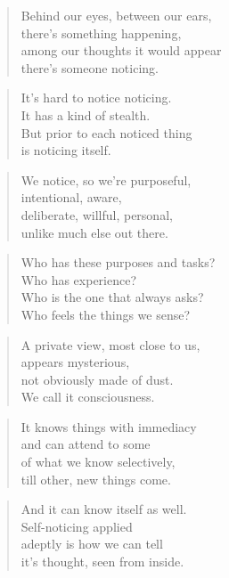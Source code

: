 \documentclass[10pt,a4paper]{article}
\begin{document}
\begin{paracol}{2}
\begin{verse}
Behind our eyes, between our ears,\\
there’s something happening,\\
among our thoughts it would appear\\
there’s someone noticing.
\end{verse}

\begin{verse}
It’s hard to notice noticing.\\
It has a kind of stealth.\\
But prior to each noticed thing\\
is noticing itself.
\end{verse}

\begin{verse}
We notice, so we’re purposeful,\\
intentional, aware,\\
deliberate, willful, personal,\\
unlike much else out there.
\end{verse}

\begin{verse}
Who has these purposes and tasks?\\
Who has experience?\\
Who is the one that always asks?\\
Who feels the things we sense?
\end{verse}

\begin{verse}
A private view, most close to us,\\
appears mysterious,\\
not obviously made of dust.\\
We call it consciousness.
\end{verse}

\begin{verse}
It knows things with immediacy\\
and can attend to some\\
of what we know selectively,\\
till other, new things come.
\end{verse}

\begin{verse}
And it can know itself as well.\\
Self-noticing applied\\
adeptly is how we can tell\\
it’s thought, seen from inside.
\end{verse}


\end{paracol}
\end{document}
